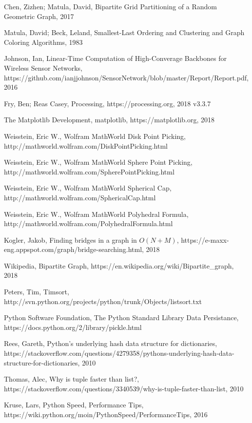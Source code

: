 \documentclass{article}
\begin{document}
\begin{thebibliography}{16}
    Chen, Zizhen; Matula, David, Bipartite Grid Partitioning of a Random Geometric Graph, 2017

    Matula, David; Beck, Leland, Smallest-Last Ordering and Clustering and Graph Coloring Algorithms, 1983

    Johnson, Ian, Linear-Time Computation of High-Converage Backbones for Wireless Sensor Networks, https://github.com/ianjjohnson/SensorNetwork/blob/master/Report/Report.pdf, 2016

    Fry, Ben; Reas Casey, Processing, https://processing.org, 2018 v3.3.7

    The Matplotlib Development, matplotlib, https://matplotlib.org, 2018

    Weisstein, Eric W., Wolfram MathWorld Disk Point Picking,
    http://mathworld.wolfram.com/DiskPointPicking.html

    Weisstein, Eric W., Wolfram MathWorld Sphere Point Picking, http://mathworld.wolfram.com/SpherePointPicking.html

    Weisstein, Eric W., Wolfram MathWorld Spherical Cap, http://mathworld.wolfram.com/SphericalCap.html

    Weisstein, Eric W., Wolfram MathWorld Polyhedral Formula, http://mathworld.wolfram.com/PolyhedralFormula.html

    Kogler, Jakob, Finding bridges in a graph in $O(N + M)$, https://e-maxx-eng.appspot.com/graph/bridge-searching.html, 2018

    Wikipedia, Bipartite Graph, https://en.wikipedia.org/wiki/Bipartite\_graph, 2018

    Peters, Tim, Timsort, http://svn.python.org/projects/python/trunk/Objects/listsort.txt

    Python Software Foundation, The Python Standard Library Data Persistance, https://docs.python.org/2/library/pickle.html

    Rees, Gareth, Python's underlying hash data structure for dictionaries, https://stackoverflow.com/questions/4279358/pythons-underlying-hash-data-structure-for-dictionaries, 2010

    Thomas, Alec, Why is tuple faster than list?, https://stackoverflow.com/questions/3340539/why-is-tuple-faster-than-list, 2010

    Kruse, Lars, Python Speed, Performance Tips, https://wiki.python.org/moin/PythonSpeed/PerformanceTips, 2016

\end{thebibliography}
\end{document}
